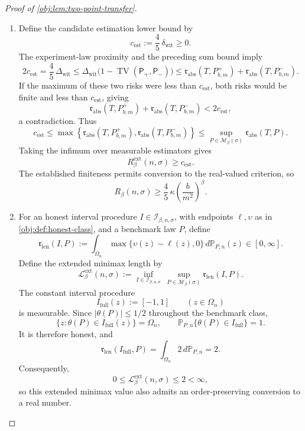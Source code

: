 \begin{proof}[Proof of \cref{obj:lem:two-point-transfer}]
\begin{enumerate}
\item
Define the candidate estimation lower bound by
\[
c_{\mathrm{est}}:=\frac45\,\delta_{\mathrm{wit}}\ge0.
\]
The experiment-law proximity and the preceding sum bound imply
\[
2c_{\mathrm{est}}
=
\frac45\,\Delta_{\mathrm{wit}}
\le
\Delta_{\mathrm{wit}}
\bigl(1-\operatorname{TV}(\mathsf P_+,\mathsf P_-)\bigr)
\le
\mathfrak r_{\mathrm{abs}}(T,P^+_{b,m})
+
\mathfrak r_{\mathrm{abs}}(T,P^-_{b,m}).
\]
If the maximum of these two risks were less than \(c_{\mathrm{est}}\), both risks would be finite and less than \(c_{\mathrm{est}}\), giving
\[
\mathfrak r_{\mathrm{abs}}(T,P^+_{b,m})
+
\mathfrak r_{\mathrm{abs}}(T,P^-_{b,m})
<
2c_{\mathrm{est}},
\]
a contradiction. Thus
\[
c_{\mathrm{est}}
\le
\max\left\{
\mathfrak r_{\mathrm{abs}}(T,P^+_{b,m}),
\mathfrak r_{\mathrm{abs}}(T,P^-_{b,m})
\right\}
\le
\sup_{P\in\mathcal M_\beta(\sigma)}
\mathfrak r_{\mathrm{abs}}(T,P).
\]
Taking the infimum over measurable estimators gives
\[
R^{\mathrm{ext}}_\beta(n,\sigma)\ge c_{\mathrm{est}}.
\]
The established finiteness permits conversion to the real-valued criterion, so
\[
R_\beta(n,\sigma)
\ge
\frac45\,\kappa\left(\frac{b}{m^2}\right)^\beta.
\]

\item
For an honest interval procedure \(I\in\mathcal I_{\beta,n,\sigma}\), with endpoints \(\ell,\upsilon\) as in \cref{obj:def:honest-class}, and a benchmark law \(P\), define
\[
\mathfrak r_{\mathrm{len}}(I,P)
:=
\int_{\Omega_n}
\max\{\upsilon(z)-\ell(z),0\}\,d\mathbb P_{P,n}(z)
\in[0,\infty].
\]
Define the extended minimax length by
\[
\mathcal L^{\mathrm{ext}}_\beta(n,\sigma)
:=
\inf_{I\in\mathcal I_{\beta,n,\sigma}}
\ \sup_{P\in\mathcal M_\beta(\sigma)}
\mathfrak r_{\mathrm{len}}(I,P).
\]
The constant interval procedure
\[
I_{\mathrm{full}}(z):=[-1,1]
\qquad(z\in\Omega_n)
\]
is measurable. Since \(|\theta(P)|\le1/2\) throughout the benchmark class,
\[
\{z:\theta(P)\in I_{\mathrm{full}}(z)\}=\Omega_n,
\qquad
\mathbb P_{P,n}\{\theta(P)\in I_{\mathrm{full}}\}=1.
\]
It is therefore honest, and
\[
\mathfrak r_{\mathrm{len}}(I_{\mathrm{full}},P)
=
\int_{\Omega_n}2\,d\mathbb P_{P,n}
=2.
\]
Consequently,
\[
0\le\mathcal L^{\mathrm{ext}}_\beta(n,\sigma)\le2<\infty,
\]
so this extended minimax value also admits an order-preserving conversion to a real number.


\end{enumerate}
\end{proof}
